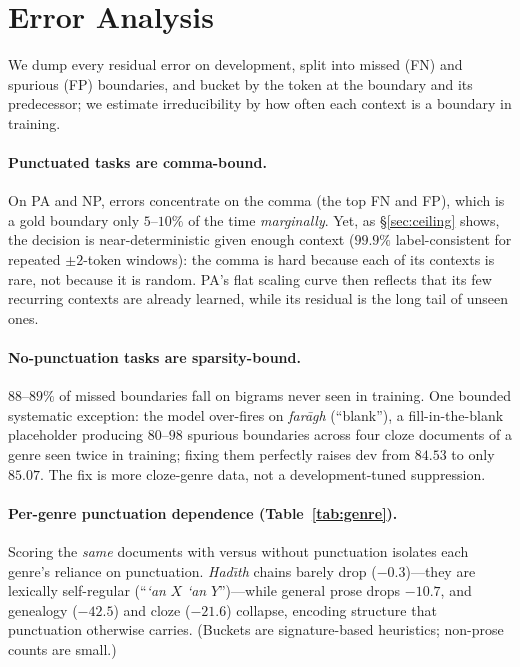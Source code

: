 \section{Error Analysis}\label{sec:error}
We dump every residual error on development, split into missed (FN) and spurious (FP)
boundaries, and bucket by the token at the boundary and its predecessor; we estimate
irreducibility by how often each context is a boundary in training.

\paragraph{Punctuated tasks are comma-bound.} On PA and NP, errors concentrate on the
comma (the top FN and FP), which is a gold boundary only $5$--$10\%$ of the time
\emph{marginally}. Yet, as \S\ref{sec:ceiling} shows, the decision is near-deterministic
given enough context ($99.9\%$ label-consistent for repeated $\pm2$-token windows): the
comma is hard because each of its contexts is rare, not because it is random. PA's flat
scaling curve then reflects that its few recurring contexts are already learned, while
its residual is the long tail of unseen ones.

\paragraph{No-punctuation tasks are sparsity-bound.} $88$--$89\%$ of missed boundaries
fall on bigrams never seen in training. One bounded systematic exception: the model
over-fires on \textit{far{\=a}gh} (``blank''), a fill-in-the-blank placeholder
producing $80$--$98$ spurious boundaries across four cloze documents of a genre seen
twice in training; fixing them perfectly raises dev \fone{} from $84.53$ to only
$85.07$. The fix is more cloze-genre data, not a development-tuned suppression.

\paragraph{Per-genre punctuation dependence (Table~\ref{tab:genre}).} Scoring the
\emph{same} documents with versus without punctuation isolates each genre's reliance
on punctuation. \textit{Had{\=\i}th} chains barely drop ($-0.3$)---they are lexically
self-regular (``\textit{`an} $X$ \textit{`an} $Y$'')---while general prose drops
$-10.7$, and genealogy ($-42.5$) and cloze ($-21.6$) collapse, encoding structure
that punctuation otherwise carries. (Buckets are signature-based heuristics;
non-prose counts are small.)

